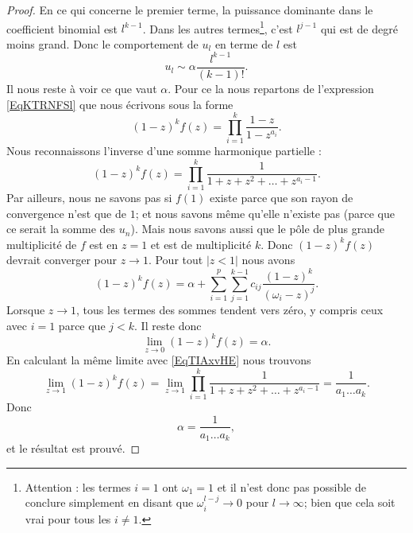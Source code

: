 \begin{proof}
    En ce qui concerne le premier terme, la puissance dominante dans le coefficient binomial est \( l^{k-1}\). Dans les autres termes\footnote{Attention : les termes \( i=1\) ont \( \omega_1=1\) et il n'est donc pas possible de conclure simplement en disant que \( \omega_i^{l-j}\to 0\) pour \( l\to \infty\); bien que cela soit vrai pour tous les \( i\neq 1\).}, c'est \( l^{j-1}\) qui est de degré moins grand. Donc le comportement de \( u_l\) en terme de \( l\) est
    \begin{equation}
        u_l\sim \alpha\frac{ l^{k-1} }{ (k-1)! }.
    \end{equation}
    Il nous reste à voir ce que vaut \( \alpha\). Pour ce la nous repartons de l'expression \ref{EqKTRNFSl} que nous écrivons sous la forme
    \begin{equation}
        (1-z)^kf(z)=\prod_{i=1}^{k}\frac{ 1-z }{ 1-z^{a_i} }.
    \end{equation}
    Nous reconnaissons l'inverse d'une somme harmonique partielle :
    \begin{equation}    \label{EqTIAxvHE}
        (1-z)^kf(z)=\prod_{i=1}^k\frac{1}{ 1+z+z^2+\ldots +z^{a_i-1} }.
    \end{equation}
    Par ailleurs, nous ne savons pas si \( f(1)\) existe parce que son rayon de convergence n'est que de \( 1\); et nous savons même qu'elle n'existe pas (parce que ce serait la somme des \( u_n\)). Mais nous savons aussi que le pôle de plus grande multiplicité de \( f\) est en \( z=1\) et est de multiplicité \( k\). Donc \( (1-z)^kf(z)\) devrait converger pour \( z\to 1\). Pour tout \( | z<1 |\) nous avons
    \begin{equation}
        (1-z)^kf(z)=\alpha+\sum_{i=1}^p\sum_{j=1}^{k-1}c_{ij}\frac{ (1-z)^k }{ (\omega_i-z)^j }.
    \end{equation}
    Lorsque \( z\to 1\), tous les termes des sommes tendent vers zéro, y compris ceux avec \( i=1\) parce que \( j<k\). Il reste donc
    \begin{equation}
        \lim_{z\to 0} (1-z)^kf(z)=\alpha.
    \end{equation}
    En calculant la même limite avec \eqref{EqTIAxvHE} nous trouvons
    \begin{equation}
        \lim_{z\to 1}(1-z)^kf(z)=\lim_{z\to 1}\prod_{i=1}^k\frac{1}{ 1+z+z^2+\ldots +z^{a_i-1} }=\frac{1}{ a_1\ldots a_k }.
    \end{equation}
    Donc
    \begin{equation}
        \alpha=\frac{1}{ a_1\ldots a_k },
    \end{equation}
    et le résultat est prouvé.
    
\end{proof}


